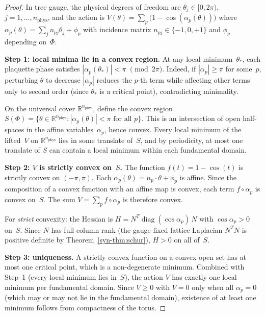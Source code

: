 \documentclass[11pt]{article}
\theoremstyle{definition}
\newcommand{\R}{\mathbb{R}}
\begin{document}
\begin{proof}
In tree gauge, the physical degrees of freedom are
$\theta_j \in [0, 2\pi)$, $j = 1, \ldots, n_{\mathrm{phys}}$,
and the action is
$V(\theta) = \sum_p \bigl(1 - \cos(\alpha_p(\theta))\bigr)$
where $\alpha_p(\theta) = \sum_j n_{pj}\theta_j + \phi_p$
with incidence matrix $n_{pj} \in \{-1,0,+1\}$ and
$\phi_p$ depending on~$\Phi$.

\smallskip
\noindent\textbf{Step 1: local minima lie in a convex region.}
At any local minimum~$\theta_*$, each plaquette
phase satisfies $|\alpha_p(\theta_*)| < \pi$
$\pmod{2\pi}$.  Indeed, if $|\alpha_p| \geq \pi$
for some~$p$, perturbing $\theta$ to decrease $|\alpha_p|$
reduces the $p$-th term while affecting other terms
only to second order (since $\theta_*$ is a critical
point), contradicting minimality.

On the universal cover $\R^{n_{\mathrm{phys}}}$,
define the convex region
$S(\Phi) = \{\theta \in \R^{n_{\mathrm{phys}}} :
|\alpha_p(\theta)| < \pi \text{ for all } p\}$.
This is an intersection of open half-spaces in the
affine variables~$\alpha_p$, hence convex.
Every local minimum of the lifted~$V$ on
$\R^{n_{\mathrm{phys}}}$ lies in some translate
of~$S$, and by periodicity, at most one translate
of $S$ can contain a local minimum within each
fundamental domain.

\smallskip
\noindent\textbf{Step 2: $V$ is strictly convex on~$S$.}
The function $f(t) = 1 - \cos(t)$ is strictly convex
on $(-\pi, \pi)$.  Each $\alpha_p(\theta) =
n_p \cdot \theta + \phi_p$ is affine.  Since the
composition of a convex function with an affine map
is convex, each term
$f \circ \alpha_p$ is convex on~$S$.
The sum $V = \sum_p f \circ \alpha_p$ is therefore
convex.

For \emph{strict} convexity: the Hessian is
$H = N^T \operatorname{diag}(\cos\alpha_p)\, N$
with $\cos\alpha_p > 0$ on~$S$.
Since $N$ has full column rank (the gauge-fixed
lattice Laplacian $N^T N$ is positive definite by
Theorem~\ref{syn-thm:schur}), $H > 0$ on all of~$S$.

\smallskip
\noindent\textbf{Step 3: uniqueness.}
A strictly convex function on a convex open set has
at most one critical point, which is a non-degenerate
minimum.  Combined with Step~1 (every local minimum
lies in~$S$), the action $V$ has exactly one local
minimum per fundamental domain.  Since $V \geq 0$
with $V = 0$ only when all $\alpha_p = 0$
(which may or may not lie in the fundamental domain),
existence of at least one minimum follows from
compactness of the torus.
\end{proof}
\end{document}
